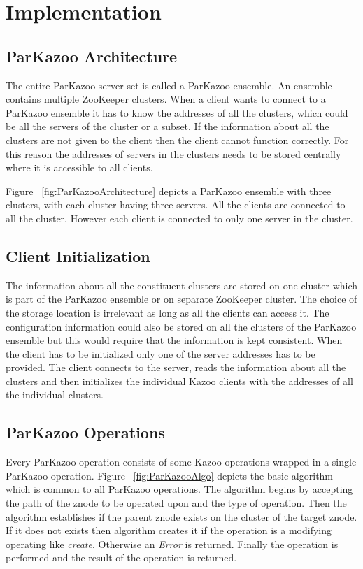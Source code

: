 \chapter{Implementation}

\section{ParKazoo Architecture}
The entire ParKazoo server set is called a ParKazoo ensemble. An ensemble contains multiple ZooKeeper clusters. When a client wants to connect to a ParKazoo ensemble it has to know the addresses of all the clusters, which could be all the servers of the cluster or a subset. If the information about all the clusters are not given to the client then the client cannot function correctly. For this reason the addresses of servers in the clusters needs to be stored centrally where it is accessible to all clients.  

\addvspace{1em}

\addvspace{1em}
Figure ~\ref{fig:ParKazooArchitecture} depicts a ParKazoo ensemble with three clusters, with each cluster having three servers. All the clients are connected to all the cluster. However each client is connected to only one server in the cluster.
  	
\section{Client Initialization}
The information about all the constituent clusters are stored on one cluster which is part of the ParKazoo ensemble or on separate ZooKeeper cluster. The choice of the storage location is irrelevant as long as all the clients can access it. The configuration information could also be stored on all the clusters of the ParKazoo ensemble but this would require that the information is kept consistent. When the client has to be initialized only one of the server addresses has to be provided. The client connects to the server, reads the information about all the clusters and then initializes the individual Kazoo clients with the addresses of all the individual clusters.

\section{ParKazoo Operations}
Every ParKazoo operation consists of some Kazoo operations wrapped in a single ParKazoo operation. Figure ~\ref{fig:ParKazooAlgo} depicts the basic algorithm which is common to all ParKazoo operations. The algorithm begins by accepting the path of the znode to be operated upon and the type of operation. Then the algorithm establishes if the parent znode exists on the cluster of the target znode. If it does not exists then algorithm creates it if the operation is a modifying operating like \textit{create}. Otherwise an \textit{Error} is returned. Finally the operation is performed and the result of the operation is returned. 

